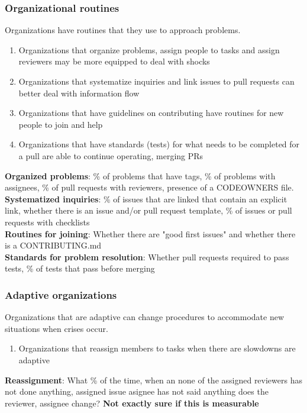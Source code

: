 \documentclass[12pt,notitlepage]{article}
\begin{document}
\subsubsection{Organizational routines}
Organizations have routines that they use to approach problems. 
\begin{enumerate}
    \item Organizations that organize problems, assign people to tasks and assign reviewers may be more equipped to deal with shocks
    \item Organizations that systematize inquiries and link issues to pull requests can better deal with information flow 
    \item Organizations that have guidelines on contributing have routines for new people to join and help
    \item Organizations that have standards (tests) for what needs to be completed for a pull are able to continue operating, merging PRs
\end{enumerate}
\textbf{Organized problems}:
\% of problems that have tags, \% of problems with assignees, \% of pull requests with reviewers, presence of a CODEOWNERS file. \\
\textbf{Systematized inquiries}:
\% of issues that are linked that contain an explicit link, whether there is an issue and/or pull request template, \% of issues or pull requests with checklists\\
\textbf{Routines for joining}:
Whether there are "good first issues" and whether there is a CONTRIBUTING.md\\
\textbf{Standards for problem resolution}:
Whether pull requests required to pass tests, \% of tests that pass before merging
\subsubsection{Adaptive organizations}
Organizations that are adaptive can change procedures to accommodate new situations when crises occur. 
\begin{enumerate}
    \item Organizations that reassign members to tasks when there are slowdowns are adaptive
\end{enumerate}
\textbf{Reassignment}: What \% of the time, when an {none of the assigned reviewers has not done anything, assigned issue asignee has not said anything} does the {reviewer, assignee} change? \textbf{Not exactly sure if this is measurable}
\end{document}
